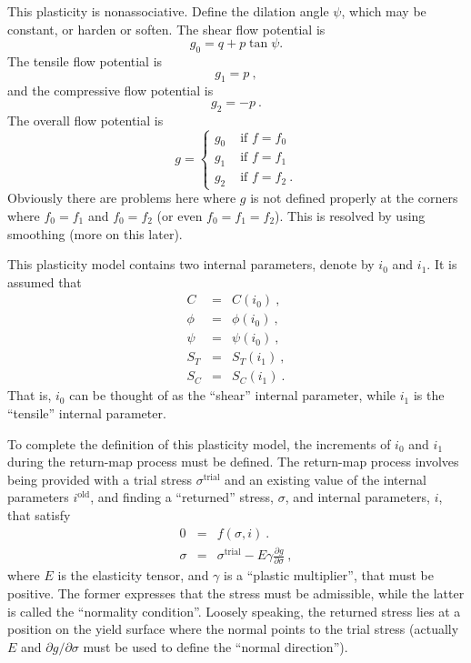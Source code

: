 \documentclass[]{scrreprt}
\begin{document}
This plasticity is nonassociative.  Define the dilation angle $\psi$,
which may be constant, or harden or soften.  The shear flow potential
is
\begin{equation}
g_{0} = q + p\tan\psi .
\end{equation}
The tensile flow potential is
\begin{equation}
g_{1} = p \ ,
\end{equation}
and the compressive flow potential is
\begin{equation}
g_{2} = - p \ .
\end{equation}
The overall flow potential is
\begin{equation}
g = \left\{
\begin{array}{ll}
g_{0} & \mbox{ if } f = f_{0} \\
g_{1} & \mbox{ if } f = f_{1} \\
g_{2} & \mbox{ if } f = f_{2}\ .
\end{array}
\label{one.g.eqn}
\right.
\end{equation}
Obviously there are problems here where $g$ is not defined properly at
the corners where $f_{0}=f_{1}$ and $f_{0}=f_{2}$ (or even
$f_{0}=f_{1}=f_{2}$).  This is resolved by using smoothing (more on
this later).

This plasticity model contains two internal parameters, denote by
$i_{0}$ and $i_{1}$.   It is assumed
that
\begin{eqnarray}
C & = & C(i_{0}) \ , \\
\phi & = & \phi(i_{0}) \ , \\
\psi & = & \psi(i_{0}) \ , \\
S_{T} & = & S_{T}(i_{1}) \ , \\
S_{C} & = & S_{C}(i_{1}) \ .
\end{eqnarray}
That is, $i_{0}$ can be thought of as the ``shear'' internal parameter,
while $i_{1}$ is the ``tensile'' internal parameter.

To complete the definition of this plasticity model, the increments of
$i_{0}$ and $i_{1}$ during the return-map process must be defined.
The return-map process involves being provided with a trial stress
$\sigma^{\mathrm{trial}}$ and an existing value of the internal
parameters $i^{\mathrm{old}}$, and finding a ``returned'' stress,
$\sigma$, and internal parameters, $i$, that satisfy
\begin{eqnarray}
0 & = & f(\sigma, i) \ . \\\label{f.zero.return}
\sigma & = & \sigma^{\mathrm{trial}} - E\gamma \frac{\partial
  g}{\partial\sigma} \ ,
\end{eqnarray}
where $E$ is the elasticity tensor, and $\gamma$ is a ``plastic
multiplier'', that must be positive.  The former expresses that the
stress must be admissible, while the latter is called the ``normality
condition''.  Loosely speaking, the returned stress lies at a position
on the yield surface where the normal points to the trial stress
(actually $E$ and $\partial g/\partial\sigma$ must be used to define
the ``normal direction'').
\end{document}
